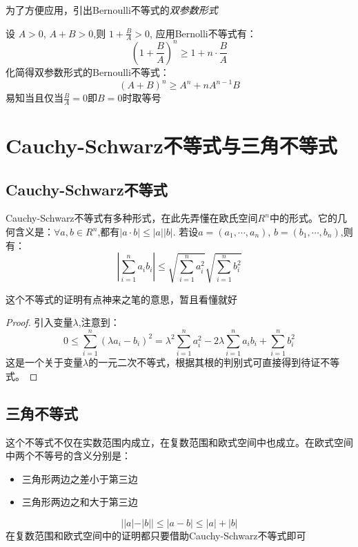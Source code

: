 为了方便应用，引出Bernoulli不等式的\emph{双参数形式}
\begin{proposition}
    设 $ A > 0 $, $ A + B > 0 $,则 $ 1 + \frac{B}{A} > 0$, 应用Bernolli不等式有：
    \begin{equation*}
        \left( 1 + \frac{B}{A} \right)^n \geq 1 + n \cdot \frac{B}{A}
    \end{equation*}
    化简得双参数形式的Bernoulli不等式：
    \begin{equation*}
        (A + B)^n \geq A^n + nA^{n-1}B
    \end{equation*}
    易知当且仅当$\frac{B}{A} = 0$即$B = 0$时取等号
\end{proposition}

\section{Cauchy-Schwarz不等式与三角不等式}
\subsection*{Cauchy-Schwarz不等式}
\begin{proposition}
    Cauchy-Schwarz不等式有多种形式，在此先弄懂在欧氏空间$R^n$中的形式。它的几何含义是：$\forall a, b \in R^n$,都有$|a \cdot b| \leq |a||b|$.
    若设$a = (a_1, \cdots, a_n)$, $b = (b_1, \cdots, b_n)$,则有：
    \begin{equation*}
        \left| \sum_{i=1}^{n}a_ib_i \right| \leq \sqrt{\sum_{i=1}^{n}a_{i}^{2}} \sqrt{\sum_{i=1}^{n}b_{i}^{2}}
    \end{equation*}
\end{proposition}

这个不等式的证明有点神来之笔的意思，暂且看懂就好
\begin{proof}
    引入变量$\lambda$,注意到：
    \begin{equation*}
        0 \leq \sum_{i=1}^{n}(\lambda a_i - b_i)^2  = \lambda^2 \sum_{i=1}^{n}a_i^2 - 2\lambda \sum_{i=1}^{n}a_i b_i 
        + \sum_{i=1}^{n}b_i^2
    \end{equation*}
    这是一个关于变量$\lambda$的一元二次不等式，根据其根的判别式可直接得到待证不等式。
\end{proof}

\subsection*{三角不等式}
这个不等式不仅在实数范围内成立，在复数范围和欧式空间中也成立。在欧式空间中两个不等号的含义分别是：
\begin{itemize}
    \item 三角形两边之差小于第三边
    \item 三角形两边之和大于第三边
\end{itemize}
\begin{equation*}
    | |a|-|b| | \leq |a-b| \leq |a| + |b|
\end{equation*}
在复数范围和欧式空间中的证明都只要借助Cauchy-Schwarz不等式即可

